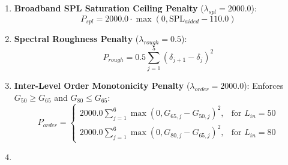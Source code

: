 \documentclass[
]{article}
\providecommand{\tightlist}{%
  \setlength{\itemsep}{0pt}\setlength{\parskip}{0pt}}
\begin{document}
\begin{enumerate}
  \begin{itemize}
  \tightlist
  \item
    \(L_{in} = 50\) dB SPL:
    \(\mathbf{K}_{50} = [1.5, 1.0, 0.8, 1.2, 1.2]\) sones
  \item
    \(L_{in} = 65\) dB SPL:
    \(\mathbf{K}_{65} = [7.0, 4.5, 4.0, 6.5, 6.0]\) sones
  \item
    \(L_{in} = 80\) dB SPL:
    \(\mathbf{K}_{80} = [20.0, 12.0, 10.0, 15.0, 14.0]\) sones
    \begin{equation}
    \text{Cap}_{base} = \text{interp}\left(\text{PTA}_{sn}, \mathbf{PTA}_{knots}, \mathbf{K}_{L_{in}}\right)
    \end{equation} \emph{Profile Adjustments:}
  \item
    Reverse-slope restriction (\(L_{in} \ge 75\) dB SPL and low-to-high
    threshold difference \(> 10\) dB):
    \(\text{Cap} = \text{Cap}_{base} - 0.10 \cdot (\overline{\text{HTL}}_{\le 500} - \overline{\text{HTL}}_{\ge 4000})\).
  \item
    Conductive air-bone gap adjustment:
    \(\text{Cap} \leftarrow \text{Cap} - 0.25 \cdot \text{PTA}_{ABG}\)
    (if \(L_{in} \ge 75\) dB SPL) or \(+0.10 \cdot \text{PTA}_{ABG}\)
    (if \(L_{in} < 75\) dB SPL).
  \end{itemize}
\item
  \textbf{Broadband SPL Saturation Ceiling Penalty}
  (\(\lambda_{spl} = 2000.0\)): \begin{equation}
  P_{spl} = 2000.0 \cdot \max\left(0, \text{SPL}_{aided} - 110.0\right)
  \end{equation}
\item
  \textbf{Spectral Roughness Penalty} (\(\lambda_{rough} = 0.5\)):
  \begin{equation}
  P_{rough} = 0.5 \sum_{j=1}^5 (\delta_{j+1} - \delta_j)^2
  \end{equation}
\item
  \textbf{Inter-Level Order Monotonicity Penalty}
  (\(\lambda_{order} = 2000.0\)): Enforces \(G_{50} \ge G_{65}\) and
  \(G_{80} \le G_{65}\): \begin{equation}
  P_{order} = \begin{cases} 
  2000.0 \sum_{j=1}^6 \max(0, G_{65, j} - G_{50, j})^2, & \text{for } L_{in} = 50 \\ 
  2000.0 \sum_{j=1}^6 \max(0, G_{80, j} - G_{65, j})^2, & \text{for } L_{in} = 80 
  \end{cases}
  \end{equation}
\item

\end{enumerate}
\end{document}
